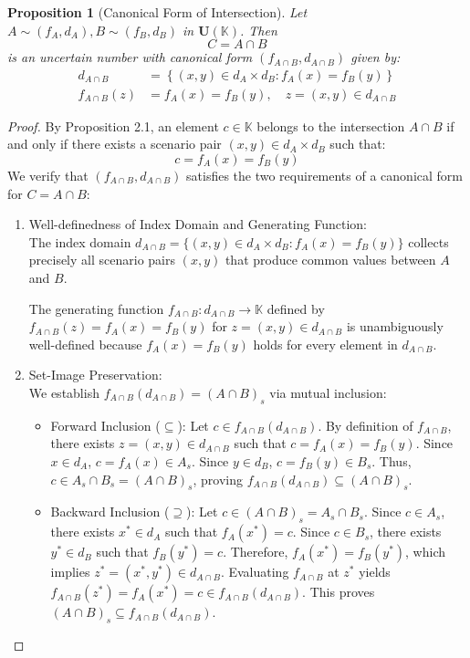 \documentclass[a4paper,12pt,twoside]{memoir}
\newtheorem{proposition}{Proposition}[chapter]
\newcommand{\set}[1]{\left\{#1\right\}} %
\newcommand{\tsbd}[1]{\mathbf{U}(\mathbb{#1})}
\begin{document}
	\begin{proposition}[Canonical Form of Intersection]
		\label{prop:dang_chuan_tac_phep_giao}
		Let $A\sim (f_A,d_A), B \sim (f_B,d_B)$ in $\tsbd{K}$. Then
		\[
		C = A \cap B
		\]
		is an uncertain number with canonical form $(f_{A\cap B},d_{A\cap B})$ given by:
		\begin{align*}
			d_{A\cap B}    & = \set{(x,y) \in d_A \times d_B : f_A(x) = f_B(y)} \\
			f_{A\cap B}(z) & = f_A(x) = f_B(y), \quad z=(x,y) \in d_{A\cap B}
		\end{align*}
	\end{proposition}
	\begin{proof}
		By Proposition 2.1, an element $c \in \mathbb{K}$ belongs to the intersection $A \cap B$ if and only if there exists a scenario pair $(x, y) \in d_A \times d_B$ such that:
		\[
		c = f_A(x) = f_B(y)
		\]
		We verify that $(f_{A \cap B}, d_{A \cap B})$ satisfies the two requirements of a canonical form for $C = A \cap B$:
		
		\begin{enumerate}[leftmargin=*]
			\item Well-definedness of Index Domain and Generating Function: \\
			The index domain $d_{A \cap B} = \{(x, y) \in d_A \times d_B : f_A(x) = f_B(y)\}$ collects precisely all scenario pairs $(x, y)$ that produce common values between $A$ and $B$.
			
			The generating function $f_{A \cap B} : d_{A \cap B} \to \mathbb{K}$ defined by $f_{A \cap B}(z) = f_A(x) = f_B(y)$ for $z = (x, y) \in d_{A \cap B}$ is unambiguously well-defined because $f_A(x) = f_B(y)$ holds for every element in $d_{A \cap B}$.
			
			\item Set-Image Preservation: \\
			We establish $f_{A \cap B}(d_{A \cap B}) = (A \cap B)_s$ via mutual inclusion:
			\begin{itemize}[leftmargin=*]
				\item Forward Inclusion ($\subseteq$):
				Let $c \in f_{A \cap B}(d_{A \cap B})$. By definition of $f_{A \cap B}$, there exists $z = (x, y) \in d_{A \cap B}$ such that $c = f_A(x) = f_B(y)$.
				Since $x \in d_A$, $c = f_A(x) \in A_s$. Since $y \in d_B$, $c = f_B(y) \in B_s$.
				Thus, $c \in A_s \cap B_s = (A \cap B)_s$, proving $f_{A \cap B}(d_{A \cap B}) \subseteq (A \cap B)_s$.
				
				\item Backward Inclusion ($\supseteq$):
				Let $c \in (A \cap B)_s = A_s \cap B_s$.
				Since $c \in A_s$, there exists $x^* \in d_A$ such that $f_A(x^*) = c$.
				Since $c \in B_s$, there exists $y^* \in d_B$ such that $f_B(y^*) = c$.
				Therefore, $f_A(x^*) = f_B(y^*)$, which implies $z^* = (x^*, y^*) \in d_{A \cap B}$.
				Evaluating $f_{A \cap B}$ at $z^*$ yields $f_{A \cap B}(z^*) = f_A(x^*) = c \in f_{A \cap B}(d_{A \cap B})$.
				This proves $(A \cap B)_s \subseteq f_{A \cap B}(d_{A \cap B})$.
			\end{itemize}
		\end{enumerate}
		

\end{proof}
\end{document}
